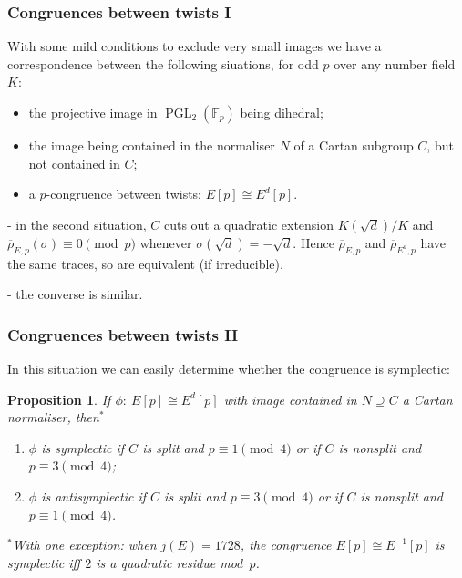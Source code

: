 \documentclass[handout]{beamer}
\newtheorem{prop}{Proposition}
\newcommand{\rhobar}{\overline{\rho}}
\newcommand{\F}{\mathbb F}
\newcommand{\PGL}{\operatorname{PGL}}
\begin{document}
\begin{frame}\frametitle{Congruences between twists I}
With some mild conditions to exclude very small images we have a
correspondence between the following siuations, for odd $p$ over any
number field $K$:
\begin{itemize}
\item the projective image in $\PGL_2(\F_p)$ being dihedral;
\item the image being contained in the normaliser $N$ of a Cartan
  subgroup $C$, but not contained in $C$;
  \item a $p$-congruence between twists: $E[p]\cong E^d[p]$.
\end{itemize}
\pause\medskip

- in the second situation, $C$ cuts out a quadratic extension
$K(\sqrt{d})/K$ and $\rhobar_{E,p}(\sigma)\equiv0\pmod{p}$ whenever
$\sigma(\sqrt{d})=-\sqrt{d}$.  Hence $\rhobar_{E,p}$ and
$\rhobar_{E^d,p}$ have the same traces, so are equivalent (if
irreducible).
\pause\medskip

- the converse is similar.
\end{frame}

\begin{frame}\frametitle{Congruences between twists II}
  In this situation we can easily determine whether the congruence is
  symplectic:
  \pause  \medskip

  \begin{prop}
  If $\phi:\ E[p]\cong E^d[p]$ with image contained in $N\supseteq C$ a
  Cartan normaliser, then${}^*$
  \begin{enumerate}
    \item $\phi$ is symplectic if $C$ is split and $p\equiv1\pmod4$ or
      if $C$ is nonsplit and $p\equiv3\pmod4$;
      \item $\phi$ is antisymplectic if $C$ is split and $p\equiv3\pmod4$ or
      if $C$ is nonsplit and $p\equiv1\pmod4$.
  \end{enumerate}

  \pause \medskip ${}^*$With one exception: when $j(E)=1728$, the
  congruence $E[p]\cong E^{-1}[p]$ is symplectic iff $2$ is a
  quadratic residue mod~$p$.
  \end{prop}

\end{frame}
\end{document}
